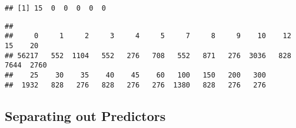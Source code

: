 \documentclass[
]{article}
\newenvironment{Shaded}{\begin{snugshade}}{\end{snugshade}}
\newcommand{\CharTok}[1]{\textcolor[rgb]{0.31,0.60,0.02}{#1}}
\newcommand{\KeywordTok}[1]{\textcolor[rgb]{0.13,0.29,0.53}{\textbf{#1}}}
\newcommand{\NormalTok}[1]{#1}
\newcommand{\OperatorTok}[1]{\textcolor[rgb]{0.81,0.36,0.00}{\textbf{#1}}}
\newcommand{\StringTok}[1]{\textcolor[rgb]{0.31,0.60,0.02}{#1}}
\begin{document}
\begin{Shaded}
\end{Shaded}

\begin{Shaded}
\end{Shaded}

\begin{verbatim}
## [1] 15  0  0  0  0  0
\end{verbatim}

\begin{Shaded}
\end{Shaded}

\begin{verbatim}
## 
##     0     1     2     3     4     5     7     8     9    10    12    15    20 
## 56217   552  1104   552   276   708   552   871   276  3036   828  7644  2760 
##    25    30    35    40    45    60   100   150   200   300 
##  1932   828   276   828   276   276  1380   828   276   276
\end{verbatim}

\hypertarget{separating-out-predictors}{%
\subsection{Separating out Predictors}\label{separating-out-predictors}}
\end{document}
